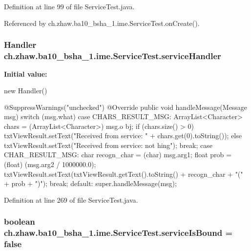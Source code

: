 Definition at line 99 of file ServiceTest.java.

Referenced by ch.zhaw.ba10\_\-bsha\_\-1.ime.ServiceTest.onCreate().\hypertarget{classch_1_1zhaw_1_1ba10__bsha__1_1_1ime_1_1ServiceTest_a396e691506a0c43959988e291d8281c3}{
\subsubsection[{serviceHandler}]{\setlength{\rightskip}{0pt plus 5cm}Handler {\bf ch.zhaw.ba10\_\-bsha\_\-1.ime.ServiceTest.serviceHandler}}}
\label{classch_1_1zhaw_1_1ba10__bsha__1_1_1ime_1_1ServiceTest_a396e691506a0c43959988e291d8281c3}
{\bfseries Initial value:}
\begin{DoxyCode}
 new Handler() {
        
        @SuppressWarnings("unchecked")
                @Override
                public void handleMessage(Message msg) {
            switch (msg.what) {
                case CHARS_RESULT_MSG:
                        ArrayList<Character> chars = (ArrayList<Character>) msg.o
      bj;
                        if (chars.size() > 0) {
                                txtViewResult.setText("Received from service: " +
       chars.get(0).toString());
                        } else {
                                txtViewResult.setText("Received from service: not
      hing");
                        }
                    break;
                case CHAR_RESULT_MSG:
                        char recogn_char = (char) msg.arg1;
                        float prob = (float) (msg.arg2 / 1000000.0);
                        txtViewResult.setText(txtViewResult.getText().toString() 
      + recogn_char + "(" + prob + ")");
                    break;
                default:
                    super.handleMessage(msg);
            }
        }
        
    }
\end{DoxyCode}


Definition at line 269 of file ServiceTest.java.\hypertarget{classch_1_1zhaw_1_1ba10__bsha__1_1_1ime_1_1ServiceTest_a1be1618594a88e74deea51ba0c351fd5}{
\subsubsection[{serviceIsBound}]{\setlength{\rightskip}{0pt plus 5cm}boolean {\bf ch.zhaw.ba10\_\-bsha\_\-1.ime.ServiceTest.serviceIsBound} = false}}
\label{classch_1_1zhaw_1_1ba10__bsha__1_1_1ime_1_1ServiceTest_a1be1618594a88e74deea51ba0c351fd5}


